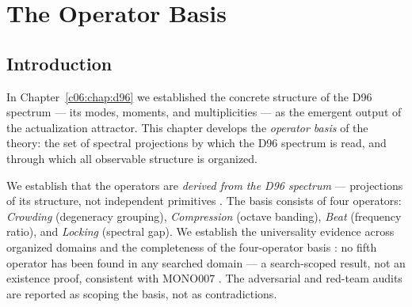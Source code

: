 %
%


\chapter{The Operator Basis}
\label{c07:chap:operators}

\section{Introduction}
\label{c07:sec:operators-introduction}

In Chapter~\ref{c06:chap:d96} we established the concrete structure of the D96 spectrum --- its
modes, moments, and multiplicities --- as the emergent output of the actualization
attractor. This chapter develops the \emph{operator basis} of the theory: the set of
spectral projections by which the D96 spectrum is read, and through which all observable
structure is organized.

We establish that the operators are \emph{derived from the D96 spectrum} --- projections of
its structure, not independent primitives
\cite{c07:QG260,c07:QG261,c07:QG262,c07:QG263}. The basis consists of four operators:
\emph{Crowding} (degeneracy grouping), \emph{Compression} (octave banding), \emph{Beat}
(frequency ratio), and \emph{Locking} (spectral gap). We establish the universality
evidence across organized domains \cite{c07:QG300,c07:QG302,c07:QG304} and the completeness of
the four-operator basis \cite{c07:QG307,c07:QG308}: no fifth operator has been found in any
searched domain --- a search-scoped result, not an existence proof, consistent with MONO007
\cite{c07:MONO007}. The adversarial and red-team audits \cite{c07:QG309,c07:QG312} are reported
as scoping the basis, not as contradictions.

